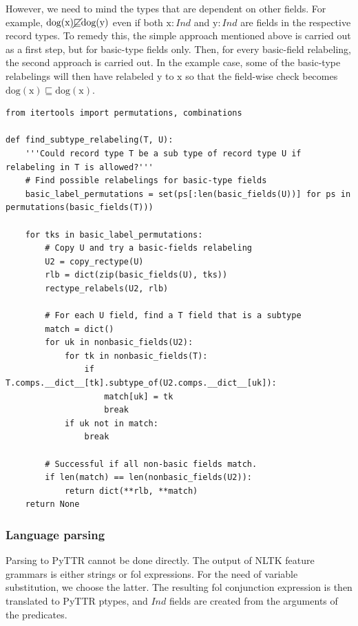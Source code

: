However, we need to mind the types that are dependent on other fields.
For example, $\text{dog}(\text{x}) \cancel{\sqsubseteq} \text{dog}(\text{y})$ even if both $\text{x}:Ind$ and $\text{y}:Ind$ are fields in the respective record types.
To remedy this, the simple approach mentioned above is carried out as a first step, but for basic-type fields only.
Then, for every basic-field relabeling, the second approach is carried out.
In the example case, some of the basic-type relabelings will then have relabeled $\text{y}$ to $\text{x}$ so that the field-wise check becomes $\text{dog}(\text{x}) \sqsubseteq \text{dog}(\text{x})$.

\begin{lstlisting}[label=lst:subtyperlb, caption=Subtype-relabeling.]
from itertools import permutations, combinations

def find_subtype_relabeling(T, U):
    '''Could record type T be a sub type of record type U if relabeling in T is allowed?'''
    # Find possible relabelings for basic-type fields
    basic_label_permutations = set(ps[:len(basic_fields(U))] for ps in permutations(basic_fields(T)))
    
    for tks in basic_label_permutations:
        # Copy U and try a basic-fields relabeling
        U2 = copy_rectype(U)
        rlb = dict(zip(basic_fields(U), tks))
        rectype_relabels(U2, rlb)
        
        # For each U field, find a T field that is a subtype
        match = dict()
        for uk in nonbasic_fields(U2):
            for tk in nonbasic_fields(T):
                if T.comps.__dict__[tk].subtype_of(U2.comps.__dict__[uk]):
                    match[uk] = tk
                    break
            if uk not in match:
                break

        # Successful if all non-basic fields match.
        if len(match) == len(nonbasic_fields(U2)):
            return dict(**rlb, **match)
    return None
\end{lstlisting}



\subsubsection{Language parsing}

Parsing to PyTTR cannot be done directly.
The output of NLTK feature grammars is either strings or \gls{fol} expressions.
For the need of variable substitution, we choose the latter.
The resulting \gls{fol} conjunction expression is then translated to PyTTR ptypes, and $Ind$ fields are created from the arguments of the predicates.

